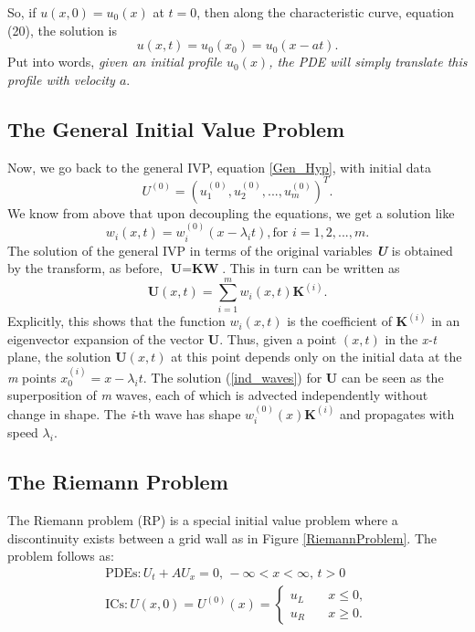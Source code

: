 \documentclass[]{article}
\begin{document}
		So, if $ u(x,0) = u_0(x) $ at $ t = 0 $, then along the characteristic curve, equation (20), the solution is
		\begin{equation}
			u(x,t) = u_0(x_0) = u_0(x-at).
			\label{general_sol}
		\end{equation}
		Put into words, \textit{given an initial profile $ u_0(x) $, the PDE will simply translate this profile with velocity $ a $}.
	
	\subsection{The General Initial Value Problem}
		Now, we go back to the general IVP, equation \ref{Gen_Hyp}, with initial data
		\begin{equation}
			U^{(0)} = (u_1^{(0)}, u_2^{(0)}, ..., u_m^{(0)})^T.
		\end{equation}
		We know from above that upon decoupling the equations, we get a solution like
		\begin{equation}
			w_i(x,t) = w_i^{(0)}(x - \lambda_i t), \mbox{for  } i = 1, 2, ..., m.
		\end{equation}
		The solution of the general IVP in terms of the original variables \textbf{\textit{U}} is obtained by the transform, as before, $ \textbf{U} = \textbf{KW} $. This in turn can be written as 
		\begin{equation}
			\textbf{U}(x,t) = \sum_{i = 1}^{m} w_i(x,t) \textbf{K}^{(i)}.
			\label{ind_waves}
		\end{equation}
		Explicitly, this shows that the function $ w_i(x,t) $ is the coefficient of $ \textbf{K}^{(i)} $ in an eigenvector expansion of the vector \textbf{U}. Thus, given a point $ (x,t) $ in the \textit{x-t} plane, the solution $ \textbf{U}(x,t) $ at this point depends only on the initial data at the \textit{m} points $ x_0^{(i)} = x - \lambda_i t $. The solution (\ref{ind_waves}) for \textbf{U} can be seen as the superposition of \textit{m} waves, each of which is advected independently without change in shape. The \textit{i}-th wave has shape $ w_i^{(0)}(x) \textbf{K}^{(i)} $ and propagates with speed $ \lambda_i $.
	
	\subsection{The Riemann Problem}
		The Riemann problem (RP) is a special initial value problem where a discontinuity exists between a grid wall as in Figure \ref{RiemannProblem}. The problem follows as:
		\begin{equation}
	    	\begin{aligned}
			\mbox{PDEs} : U_t + A U_x = 0\mbox{, } -\infty < x < \infty \mbox{, } t > 0 \\
			\mbox{ICs}: U(x,0) = U^{(0)}(x) = \left\{
			\begin{array}{ll}
			u_L & \quad x \leq 0, \\
			u_R & \quad x \geq 0.
			\end{array}
			\right.
		    \end{aligned}
		    \label{GeneralizedShockTubeProb}
		\end{equation}
	
\end{document}
